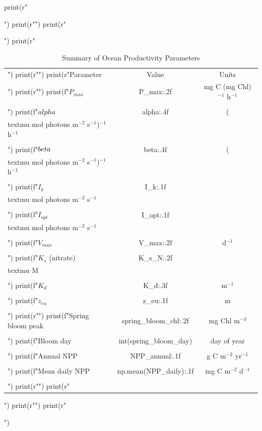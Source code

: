 \documentclass[a4paper, 11pt]{article}
\begin{document}
\begin{pycode}
print(r"\begin{table}[htbp]")
print(r"\centering")
print(r"\caption{Summary of Ocean Productivity Parameters}")
print(r"\begin{tabular}{lcc}")
print(r"\toprule")
print(r"Parameter & Value & Units \\")
print(r"\midrule")
print(f"$P_{{max}}$ & {P_max:.2f} & mg C (mg Chl)$^{{-1}}$ h$^{{-1}}$ \\\\")
print(f"$\\alpha$ & {alpha:.4f} & (\\textmu mol photons m$^{{-2}}$ s$^{{-1}}$)$^{{-1}}$ h$^{{-1}}$ \\\\")
print(f"$\\beta$ & {beta:.4f} & (\\textmu mol photons m$^{{-2}}$ s$^{{-1}}$)$^{{-1}}$ h$^{{-1}}$ \\\\")
print(f"$I_k$ & {I_k:.1f} & \\textmu mol photons m$^{{-2}}$ s$^{{-1}}$ \\\\")
print(f"$I_{{opt}}$ & {I_opt:.1f} & \\textmu mol photons m$^{{-2}}$ s$^{{-1}}$ \\\\")
print(f"$V_{{max}}$ & {V_max:.2f} & d$^{{-1}}$ \\\\")
print(f"$K_s$ (nitrate) & {K_s_N:.2f} & \\textmu M \\\\")
print(f"$K_d$ & {K_d:.3f} & m$^{{-1}}$ \\\\")
print(f"$z_{{eu}}$ & {z_eu:.1f} & m \\\\")
print(r"\midrule")
print(f"Spring bloom peak & {spring_bloom_chl:.2f} & mg Chl m$^{{-3}}$ \\\\")
print(f"Bloom day & {int(spring_bloom_day)} & day of year \\\\")
print(f"Annual NPP & {NPP_annual:.1f} & g C m$^{{-2}}$ yr$^{{-1}}$ \\\\")
print(f"Mean daily NPP & {np.mean(NPP_daily):.1f} & mg C m$^{{-2}}$ d$^{{-1}}$ \\\\")
print(r"\bottomrule")
print(r"\end{tabular}")
print(r"\label{tab:summary}")
print(r"\end{table}")
\end{pycode}
\end{document}
